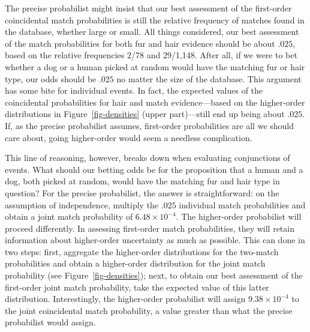 \documentclass[
  letterpaper,
  DIV=11,
  numbers=noendperiod]{scrartcl}
\begin{document}
The precise probabilist might insist that our best assessment of the
first-order coincidental match probabilities is still the relative
frequency of matches found in the database, whether large or small. All
things considered, our best assessment of the match probabilities for
both fur and hair evidence should be about \(.025\), based on the
relative frequencies 2/78 and 29/1,148. After all, if we were to bet
whether a dog or a human picked at random would have the matching fur or
hair type, our odds should be \(.025\) no matter the size of the
database. This argument has some bite for individual events. In fact,
the expected values of the coincidental probabilities for hair and match
evidence---based on the higher-order distributions in
Figure~\ref{fig-densities} (upper part)---still end up being about
\(.025\). If, as the precise probabilist assumes, first-order
probabilities are all we should care about, going higher-order would
seem a needless complication.

This line of reasoning, however, breaks down when evaluating
conjunctions of events. What should our betting odds be for the
proposition that a human and a dog, both picked at random, would have
the matching fur and hair type in question? For the precise probabilist,
the answer is straightforward: on the assumption of independence,
multiply the \(.025\) individual match probabilities and obtain a joint
match probability of \ensuremath{6.48\times 10^{-4}}. The higher-order
probabilist will proceed differently. In assessing first-order match
probabilities, they will retain information about higher-order
uncertainty as much as possible. This can done in two steps: first,
aggregate the higher-order distributions for the two-match probabilities
and obtain a higher-order distribution for the joint match probability
(see Figure~\ref{fig-densities}); next, to obtain our best assessment of
the first-order joint match probability, take the expected value of this
latter distribution. Interestingly, the higher-order probabilist will
assign \ensuremath{9.38\times 10^{-4}} to the joint coincidental match
probability, a value greater than what the precise probabilist would
assign.
\end{document}
